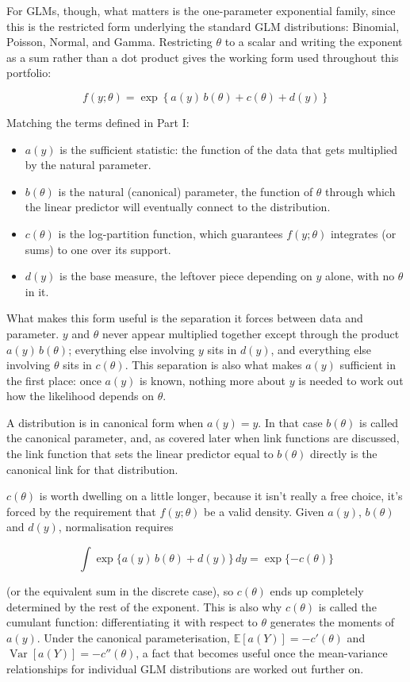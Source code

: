 For GLMs, though, what matters is the one-parameter exponential family, since this is the restricted form underlying the standard GLM distributions: Binomial, Poisson, Normal, and Gamma. Restricting $\theta$ to a scalar and writing the exponent as a sum rather than a dot product gives the working form used throughout this portfolio:
\begin{mathbox}
\[
f(y;\theta) = \exp\left\{a(y)\,b(\theta) + c(\theta) + d(y)\right\}
\]
\end{mathbox}
Matching the terms defined in Part I:
\begin{itemize}
\item $a(y)$ is the sufficient statistic: the function of the data that gets multiplied by the natural parameter.
\item $b(\theta)$ is the natural (canonical) parameter, the function of $\theta$ through which the linear predictor will eventually connect to the distribution.
\item $c(\theta)$ is the log-partition function, which guarantees $f(y;\theta)$ integrates (or sums) to one over its support.
\item $d(y)$ is the base measure, the leftover piece depending on $y$ alone, with no $\theta$ in it.
\end{itemize}
What makes this form useful is the separation it forces between data and parameter. $y$ and $\theta$ never appear multiplied together except through the product $a(y)\,b(\theta)$; everything else involving $y$ sits in $d(y)$, and everything else involving $\theta$ sits in $c(\theta)$. This separation is also what makes $a(y)$ sufficient in the first place: once $a(y)$ is known, nothing more about $y$ is needed to work out how the likelihood depends on $\theta$.

A distribution is in canonical form when $a(y)=y$. In that case $b(\theta)$ is called the canonical parameter, and, as covered later when link functions are discussed, the link function that sets the linear predictor equal to $b(\theta)$ directly is the canonical link for that distribution.

$c(\theta)$ is worth dwelling on a little longer, because it isn't really a free choice, it's forced by the requirement that $f(y;\theta)$ be a valid density. Given $a(y)$, $b(\theta)$ and $d(y)$, normalisation requires
\begin{mathbox}
\[
\int \exp\{a(y)\,b(\theta)+d(y)\}\,dy = \exp\{-c(\theta)\}
\]
\end{mathbox}
(or the equivalent sum in the discrete case), so $c(\theta)$ ends up completely determined by the rest of the exponent. This is also why $c(\theta)$ is called the cumulant function: differentiating it with respect to $\theta$ generates the moments of $a(y)$. Under the canonical parameterisation, $\mathbb{E}[a(Y)] = -c'(\theta)$ and $\operatorname{Var}[a(Y)] = -c''(\theta)$, a fact that becomes useful once the mean-variance relationships for individual GLM distributions are worked out further on.


